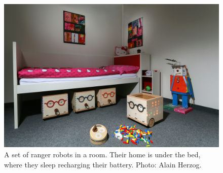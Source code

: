 \documentclass{sig-alternate}
\begin{document}
\begin{figure}[t]
 \centering
    \includegraphics[width=0.9\columnwidth]{ranger-room.jpg}
  \caption{A set of ranger robots in a room. Their home is under the bed, where they sleep recharging their battery. Photo: Alain Herzog.}
  \label{fig:ranger_room} 
\end{figure}
\end{document}
